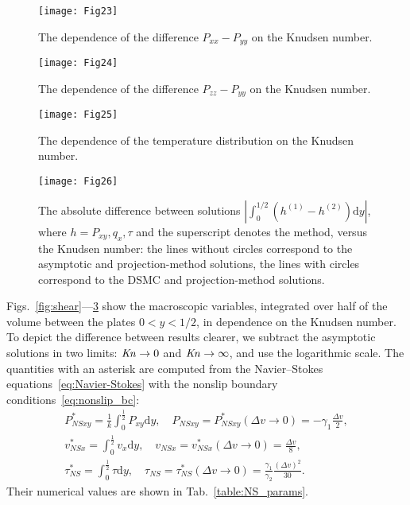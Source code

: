 \documentclass[final]{jfm} %
\newcommand{\Kn}{\mbox{\textit{Kn}}}
\newcommand{\NS}{N\!S}
\newcommand{\dd}{\mathrm{d}}
\begin{document}
\begin{figure}
    \centering
    \texttt{[image: Fig23]}
    \caption{The dependence of the difference \(P_{xx}-P_{yy}\) on the Knudsen number.}
    \label{fig:pxx}
\end{figure}

\begin{figure}
    \centering
    \texttt{[image: Fig24]}
    \caption{The dependence of the difference \(P_{zz}-P_{yy}\) on the Knudsen number.}
    \label{fig:pzz}
\end{figure}

\begin{figure}
    \centering
    \texttt{[image: Fig25]}
    \caption{The dependence of the temperature distribution on the Knudsen number.}
    \label{fig:temp}
\end{figure}

\begin{figure}
    \centering
    \texttt{[image: Fig26]}
    \caption{The absolute difference between solutions \(|\int_0^{1/2} (h^{(1)}-h^{(2)})\dd{y}|\),
        where \(h = P_{xy}, q_x, \tau\) and the superscript denotes the method, versus the Knudsen number:
        the lines without circles correspond to the asymptotic and projection-method solutions,
        the lines with circles correspond to the DSMC and projection-method solutions.}
    \label{fig:diff}
\end{figure}

Figs.~\ref{fig:shear}---\ref{fig:temp} show the macroscopic variables,
integrated over half of the volume between the plates \(0<y<1/2\), in dependence on the Knudsen number.
To depict the difference between results clearer,
we subtract the asymptotic solutions in two limits: \(\Kn\to0\) and \(\Kn\to\infty\),
and use the logarithmic scale.
The quantities with an asterisk are computed from the Navier--Stokes equations~\eqref{eq:Navier-Stokes}
with the nonslip boundary conditions~\eqref{eq:nonslip_bc}:
\begin{gather*}
    P_{\NS xy}^* = \frac1k \int_0^\frac12 P_{xy} \dd{y}, \quad P_{\NS xy} = P_{\NS xy}^*(\Delta{v}\to0) = -\gamma_1\frac{\Delta{v}}2, \\
    v_{\NS x}^* = \int_0^\frac12 v_x \dd{y}, \quad v_{\NS x} = v_{\NS x}^*(\Delta{v}\to0) = \frac{\Delta{v}}8, \\
    \tau_{\NS}^* = \int_0^\frac12 \tau \dd{y}, \quad
        \tau_{\NS} = \tau_{\NS}^*(\Delta{v}\to0) = \frac{\gamma_1}{\gamma_2}\frac{(\Delta{v})^2}{30}.
\end{gather*}
Their numerical values are shown in Tab.~\ref{table:NS_params}.
\end{document}
